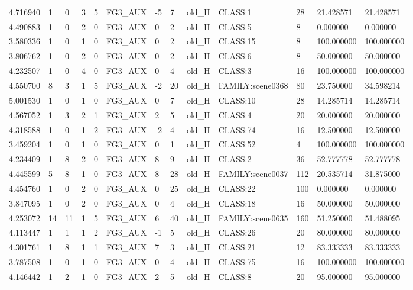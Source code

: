 \begin{tabular}{lllllllllllll}
4.716940 & 1 & 0 & 3 & 5 & FG3\_AUX & -5 & 7 & old\_H & CLASS:1 & 28 & 21.428571 & 21.428571 \\
4.490883 & 1 & 0 & 2 & 0 & FG3\_AUX & 0 & 2 & old\_H & CLASS:5 & 8 & 0.000000 & 0.000000 \\
3.580336 & 1 & 0 & 1 & 0 & FG3\_AUX & 0 & 2 & old\_H & CLASS:15 & 8 & 100.000000 & 100.000000 \\
3.806762 & 1 & 0 & 2 & 0 & FG3\_AUX & 0 & 2 & old\_H & CLASS:6 & 8 & 50.000000 & 50.000000 \\
4.232507 & 1 & 0 & 4 & 0 & FG3\_AUX & 0 & 4 & old\_H & CLASS:3 & 16 & 100.000000 & 100.000000 \\
4.550700 & 8 & 3 & 1 & 5 & FG3\_AUX & -2 & 20 & old\_H & FAMILY:scene0368 & 80 & 23.750000 & 34.598214 \\
5.001530 & 1 & 0 & 1 & 0 & FG3\_AUX & 0 & 7 & old\_H & CLASS:10 & 28 & 14.285714 & 14.285714 \\
4.567052 & 1 & 3 & 2 & 1 & FG3\_AUX & 2 & 5 & old\_H & CLASS:4 & 20 & 20.000000 & 20.000000 \\
4.318588 & 1 & 0 & 1 & 2 & FG3\_AUX & -2 & 4 & old\_H & CLASS:74 & 16 & 12.500000 & 12.500000 \\
3.459204 & 1 & 0 & 1 & 0 & FG3\_AUX & 0 & 1 & old\_H & CLASS:52 & 4 & 100.000000 & 100.000000 \\
4.234409 & 1 & 8 & 2 & 0 & FG3\_AUX & 8 & 9 & old\_H & CLASS:2 & 36 & 52.777778 & 52.777778 \\
4.445599 & 5 & 8 & 1 & 0 & FG3\_AUX & 8 & 28 & old\_H & FAMILY:scene0037 & 112 & 20.535714 & 31.875000 \\
4.454760 & 1 & 0 & 2 & 0 & FG3\_AUX & 0 & 25 & old\_H & CLASS:22 & 100 & 0.000000 & 0.000000 \\
3.847095 & 1 & 0 & 2 & 0 & FG3\_AUX & 0 & 4 & old\_H & CLASS:18 & 16 & 50.000000 & 50.000000 \\
4.253072 & 14 & 11 & 1 & 5 & FG3\_AUX & 6 & 40 & old\_H & FAMILY:scene0635 & 160 & 51.250000 & 51.488095 \\
4.113447 & 1 & 1 & 1 & 2 & FG3\_AUX & -1 & 5 & old\_H & CLASS:26 & 20 & 80.000000 & 80.000000 \\
4.301761 & 1 & 8 & 1 & 1 & FG3\_AUX & 7 & 3 & old\_H & CLASS:21 & 12 & 83.333333 & 83.333333 \\
3.787508 & 1 & 0 & 1 & 0 & FG3\_AUX & 0 & 4 & old\_H & CLASS:75 & 16 & 100.000000 & 100.000000 \\
4.146442 & 1 & 2 & 1 & 0 & FG3\_AUX & 2 & 5 & old\_H & CLASS:8 & 20 & 95.000000 & 95.000000 \\

\end{tabular}
